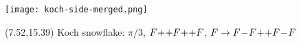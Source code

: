 \documentclass[final]{beamer}
\newcommand{\nt}{\negthinspace}
\newcommand{\m}{\nt-\nt}
\newcommand{\p}{\nt+\nt}
\begin{document}
\begin{frame}{}
\texttt{[image: koch-side-merged.png]}
\begin{textblock}{20}(7.52,15.39)
Koch snowflake: $\pi/3$, $F\p+ F\p+ F$, $F\to F\m F\p+ F\m F$
\end{textblock}
\end{frame}
\end{document}

